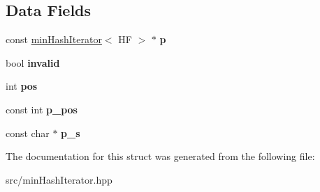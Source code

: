 \subsection*{Data Fields}
\begin{DoxyCompactItemize}
\item 
\mbox{\label{structminHashResultIterator_a2b72a12d2308651683e234c40bb32644}} 
const \hyperlink{classminHashIterator}{min\+Hash\+Iterator}$<$ HF $>$ $\ast$ {\bfseries p}
\item 
\mbox{\label{structminHashResultIterator_aa13c5c82f0d119bd3769586d76aaee2e}} 
bool {\bfseries invalid}
\item 
\mbox{\label{structminHashResultIterator_afa7827e2ec0b92712e56c766096ed954}} 
int {\bfseries pos}
\item 
\mbox{\label{structminHashResultIterator_a2e51af04a486746af28c12cbad8c749a}} 
const int {\bfseries p\+\_\+pos}
\item 
\mbox{\label{structminHashResultIterator_a05800830f899eea64c393f55de3ffcdf}} 
const char $\ast$ {\bfseries p\+\_\+s}
\end{DoxyCompactItemize}


The documentation for this struct was generated from the following file\+:\begin{DoxyCompactItemize}
\item 
src/min\+Hash\+Iterator.\+hpp\end{DoxyCompactItemize}
